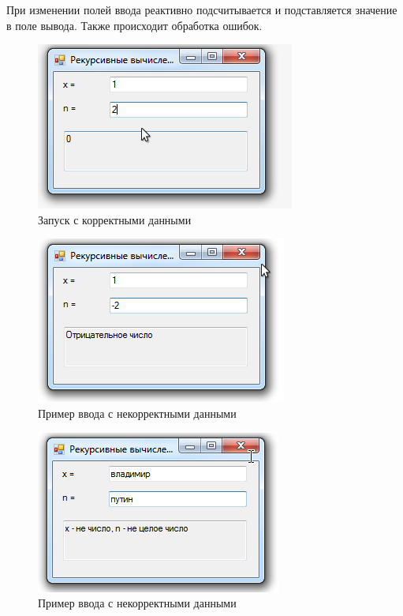 При изменении полей ввода реактивно подсчитывается и подставляется значение в поле вывода. Также происходит обработка ошибок.

\begin{figure}
\centering
\includegraphics[width=0.5\linewidth]{images//recursive-calculations/okay.png}
\caption{Запуск с корректными данными}
\label{fig:recursive-calculations-okay}
\end{figure}

\begin{figure}
\centering
\includegraphics[width=0.5\linewidth]{images//recursive-calculations/error.png}
\caption{Пример ввода с некорректными данными}
\label{fig:recursive-calculations-error}
\end{figure}

\begin{figure}
\centering
\includegraphics[width=0.5\linewidth]{images//recursive-calculations/error2.png}
\caption{Пример ввода с некорректными данными}
\label{fig:recursive-calculations-error2}
\end{figure}

